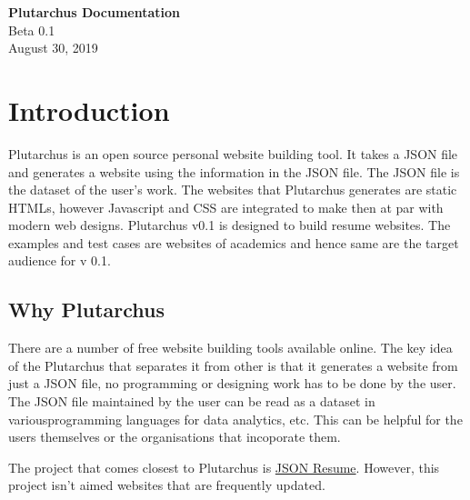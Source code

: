 \documentclass[12pt]{article}
\newcommand{\blank}[1]{\hspace*{#1}\linebreak[0]}
\begin{document}
\begin{titlepage}
    \begin{center}
        \vspace*{1cm}
        \Huge
        \textbf{Plutarchus Documentation}
        \\
        \LARGE
        \vspace{0.5cm}
         Beta 0.1
         \\
        \vspace{1.5cm}
        \vspace{8.5cm}
        \vspace{1cm}
        \hspace{2cm}
        \blank{6cm} August 30, 2019
    \end{center}
 \end{titlepage}
 
    \tableofcontents
    \newpage
    \section{Introduction}

    Plutarchus is an open source personal website building tool. It takes a JSON file and generates a website using the information in the JSON file. The JSON file is the dataset of the user's work. The websites that Plutarchus generates are static HTMLs, however Javascript and CSS are integrated to make then at par with modern web designs. Plutarchus v0.1 is designed to build resume websites. The examples and test cases are websites of academics and hence same are the target audience for v 0.1.

 
    \subsection{Why Plutarchus}

    There are a number of free website building tools available online. The key idea of the Plutarchus that separates it from other is that it generates a website from just a JSON file, no programming or designing work has to be done by the user.
    The JSON file maintained by the user can be read as a dataset in variousprogramming languages for data analytics, etc. This can be helpful for the users themselves or the organisations that incoporate them. 

    The project that comes closest to Plutarchus is \href{http://jsonresume.org/}{JSON Resume}.
    However, this project isn't aimed websites that are frequently updated.   
\end{document}
